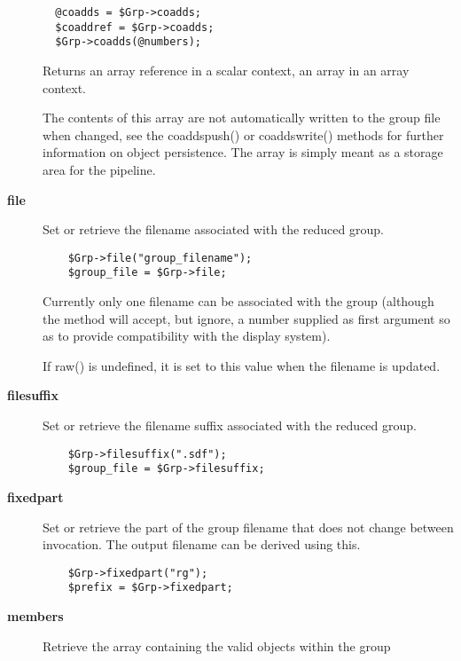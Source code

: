 \begin{description}
\begin{verbatim}
  @coadds = $Grp->coadds;
  $coaddref = $Grp->coadds;
  $Grp->coadds(@numbers);
\end{verbatim}


Returns an array reference in a scalar context, an array in an
array context.



The contents of this array are not automatically written to the 
group file when changed, see the coaddspush() or coaddswrite() methods
for further information on object persistence. The array is simply
meant as a storage area for the pipeline.


\item[\textbf{file}] \mbox{}

Set or retrieve the filename associated with the
reduced group.

\begin{verbatim}
    $Grp->file("group_filename");
    $group_file = $Grp->file;
\end{verbatim}


Currently only one filename can be associated with the group
(although the method will accept, but ignore, a number supplied
as first argument so as to provide compatibility with the
display system).



If raw() is undefined, it is set to this value when the filename is updated.


\item[\textbf{filesuffix}] \mbox{}

Set or retrieve the filename suffix associated with the
reduced group.

\begin{verbatim}
    $Grp->filesuffix(".sdf");
    $group_file = $Grp->filesuffix;
\end{verbatim}

\item[\textbf{fixedpart}] \mbox{}

Set or retrieve the part of the group filename that does not
change between invocation. The output filename can be derived using
this.

\begin{verbatim}
    $Grp->fixedpart("rg");
    $prefix = $Grp->fixedpart;
\end{verbatim}

\item[\textbf{members}] \mbox{}

Retrieve the array containing the valid objects within the group


\end{description}
